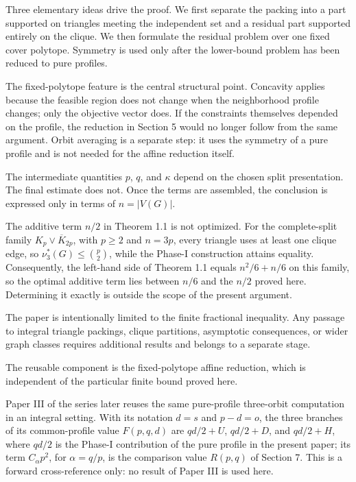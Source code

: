 \documentclass[english,11pt,a4paper]{article}
\begin{document}
Three elementary ideas drive the proof. We first separate the packing
into a part supported on triangles meeting the independent set and a
residual part supported entirely on the clique. We then formulate the
residual problem over one fixed cover polytope. Symmetry is used only
after the lower-bound problem has been reduced to pure profiles.

The fixed-polytope feature is the central structural point. Concavity
applies because the feasible region does not change when the
neighborhood profile changes; only the objective vector does. If the
constraints themselves depended on the profile, the reduction in Section
5 would no longer follow from the same argument. Orbit averaging is a
separate step: it uses the symmetry of a pure profile and is not needed
for the affine reduction itself.

The intermediate quantities \(p\), \(q\), and \(\kappa\) depend on the
chosen split presentation. The final estimate does not. Once the terms
are assembled, the conclusion is expressed only in terms of
\(n=|V(G)|\).

The additive term \(n/2\) in Theorem 1.1 is not optimized. For the
complete-split family \(K_p\vee\overline{K}_{2p}\), with \(p\ge2\) and
\(n=3p\), every triangle uses at least one clique edge, so
\(\nu_3^*(G)\le\binom p2\), while the Phase-I construction attains
equality. Consequently, the left-hand side of Theorem 1.1 equals
\(n^2/6+n/6\) on this family, so the optimal additive term lies between
\(n/6\) and the \(n/2\) proved here. Determining it exactly is outside
the scope of the present argument.

The paper is intentionally limited to the finite fractional inequality.
Any passage to integral triangle packings, clique partitions, asymptotic
consequences, or wider graph classes requires additional results and
belongs to a separate stage.

The reusable component is the fixed-polytope affine reduction, which is
independent of the particular finite bound proved here.

Paper III of the series later reuses the same pure-profile three-orbit
computation in an integral setting. With its notation \(d=s\) and
\(p-d=o\), the three branches of its common-profile value \(F(p,q,d)\)
are \(qd/2+U\), \(qd/2+D\), and \(qd/2+H\), where \(qd/2\) is the
Phase-I contribution of the pure profile in the present paper; its term
\(C_\alpha p^2\), for \(\alpha=q/p\), is the comparison value \(R(p,q)\)
of Section 7. This is a forward cross-reference only: no result of Paper
III is used here.
\end{document}
